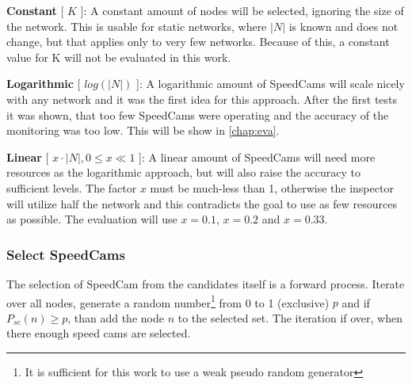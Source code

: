 \documentclass[thesis.tex]{subfiles}
\begin{document}
\textbf{Constant} [ $K$ ]: A constant amount of nodes will be selected, ignoring the size of the network. This is usable for static networks, where $|N|$ is known and does not change, but that applies only to very few networks. Because of this, a constant value for K will not be evaluated in this work.

\textbf{Logarithmic} [ $log(|N|)$ ]: A logarithmic amount of SpeedCams will scale nicely with any network and it was the first idea for this approach. After the first tests it was shown, that too few SpeedCams were operating and the accuracy of the monitoring was too low. This will be show in \autoref{chap:eva}.

\textbf{Linear} [ $x\cdot |N|, 0 \leq x\ll1$ ]: A linear amount of SpeedCams will need more resources as the logarithmic approach, but will also raise the accuracy to sufficient levels. The factor $x$ must be much-less than 1, otherwise the inspector will utilize half the network and this contradicts the goal to use as few resources as possible. The evaluation will use $x=0.1$, $x=0.2$ and $x=0.33$.

\newpage
\subsubsection{Select SpeedCams} \label{sec:main:selectionPhase:selecting}

The selection of SpeedCam from the candidates itself is a forward process. Iterate over all nodes, generate a random number\footnote{It is sufficient for this work to use a weak pseudo random generator} from 0 to 1 (exclusive) $p$ and if $P_{sc}(n) \geq p$, than add the node $n$ to the selected set. The iteration if over, when there enough speed cams are selected.
\end{document}
